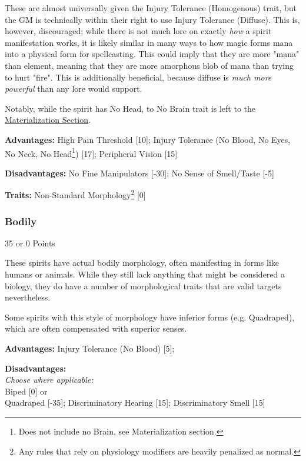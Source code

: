 \begin{multicols*}{3}
	These are almost universally given the Injury Tolerance (Homogenous) trait, but the GM is technically within their right to use Injury Tolerance (Diffuse). This is, however, discouraged; while there is not much lore on exactly \textit{how} a spirit manifestation works, it is likely similar in many ways to how magic forms mana into a physical form for spellcasting. This could imply that they are more "mana" than element, meaning that they are more amorphous blob of mana than trying to hurt "fire". This is additionally beneficial, because diffuse is \textit{much more powerful} than any lore would support.
	
	Notably, while the spirit has No Head, to No Brain trait is left to the \hyperref[materialization]{Materialization Section}.
	
	\textbf{Advantages:} 
	High Pain Threshold [10]; Injury Tolerance (No Blood, No Eyes, No Neck, No Head\footnote{Does not include no Brain, see Materialization section.}) [17]; Peripheral Vision [15]
	
	\textbf{Disadvantages:}
	No Fine Manipulators [-30]; No Sense of Smell/Taste [-5]
	
	\textbf{Traits:}
	Non-Standard Morphology\footnote{Any rules that rely on physiology modifiers are heavily penalized as normal.} [0]
	
	\subsubsection*{Bodily}\label{bodily}
	\begin{flushright}
		35 or 0 Points
	\end{flushright}
	
	These spirits have actual bodily morphology, often manifesting in forms like humans or animals. While they still lack anything that might be considered a biology, they do have a number of morphological traits that are valid targets nevertheless.
	
	Some spirits with this style of morphology have inferior forms (e.g. Quadraped), which are often compensated with superior senses.
	
	\textbf{Advantages:} 
	Injury Tolerance (No Blood) [5];
	
	\textbf{Disadvantages:}
	\textit{\\Choose where applicable:\\}
	Biped [0] or\\
	Quadraped [-35]; Discriminatory Hearing [15]; Discriminatory Smell [15]\\
	

\end{multicols*}
